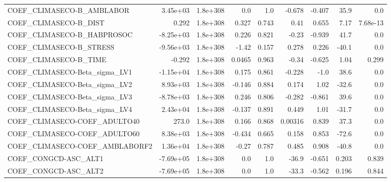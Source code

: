 \begin{tabular}{lrrrrrrrr}
COEF\_CLIMASECO-B\_AMBLABOR         &    3.45e+03 &     1.8e+308 &      0.0 &      1.0 &     -0.678 &      -0.407 &         35.9 &           0.0 \\
COEF\_CLIMASECO-B\_DIST             &       0.292 &     1.8e+308 &    0.327 &    0.743 &       0.41 &       0.655 &         7.17 &      7.68e-13 \\
COEF\_CLIMASECO-B\_HABPROSOC        &   -8.25e+03 &     1.8e+308 &    0.226 &    0.821 &      -0.23 &      -0.939 &         41.7 &           0.0 \\
COEF\_CLIMASECO-B\_STRESS           &   -9.56e+03 &     1.8e+308 &    -1.42 &    0.157 &      0.278 &       0.226 &        -40.1 &           0.0 \\
COEF\_CLIMASECO-B\_TIME             &      -0.292 &     1.8e+308 &   0.0465 &    0.963 &      -0.34 &      -0.625 &         1.04 &         0.299 \\
COEF\_CLIMASECO-Beta\_sigma\_LV1     &   -1.15e+04 &     1.8e+308 &    0.175 &    0.861 &     -0.228 &        -1.0 &         38.6 &           0.0 \\
COEF\_CLIMASECO-Beta\_sigma\_LV2     &    8.93e+03 &     1.8e+308 &   -0.146 &    0.884 &      0.174 &        1.02 &        -32.6 &           0.0 \\
COEF\_CLIMASECO-Beta\_sigma\_LV3     &   -8.78e+03 &     1.8e+308 &    0.246 &    0.806 &     -0.282 &      -0.861 &         39.6 &           0.0 \\
COEF\_CLIMASECO-Beta\_sigma\_LV4     &    2.43e+04 &     1.8e+308 &   -0.137 &    0.891 &      0.449 &        1.01 &        -31.7 &           0.0 \\
COEF\_CLIMASECO-COEF\_ADULTO40      &       273.0 &     1.8e+308 &    0.166 &    0.868 &    0.00316 &       0.839 &         37.3 &           0.0 \\
COEF\_CLIMASECO-COEF\_ADULTO60      &    8.38e+03 &     1.8e+308 &   -0.434 &    0.665 &      0.158 &       0.853 &        -72.6 &           0.0 \\
COEF\_CLIMASECO-COEF\_AMBLABORF2    &    1.36e+04 &     1.8e+308 &    -0.27 &    0.787 &      0.485 &       0.908 &        -40.8 &           0.0 \\
COEF\_CONGCD-ASC\_ALT1              &   -7.69e+05 &     1.8e+308 &      0.0 &      1.0 &      -36.9 &      -0.651 &        0.203 &         0.839 \\
COEF\_CONGCD-ASC\_ALT2              &   -7.69e+05 &     1.8e+308 &      0.0 &      1.0 &      -33.3 &      -0.562 &        0.196 &         0.844 \\

\end{tabular}
